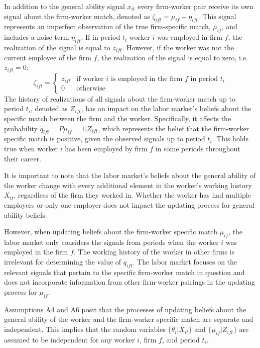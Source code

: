 \documentclass[12pt]{article}
\begin{document}
\begin{enumerate}[label={A}{\arabic*}.]
    In addition to the general ability signal $x_{it}$ every firm-worker pair receive its own signal about the firm-worker match, denoted as $\zeta_{ift} = \mu_{if} + \eta_{ift}$. This signal represents an imperfect observation of the true firm-specific match, $\mu_{if}$, and includes a noise term $\eta_{ift}$. If in period $t_i$ worker $i$ was employed in firm $f$, the realization of the signal is equal to $z_{ift}$. However, if the worker was not the current employee of the firm $f$, the realization of the signal is equal to zero, i.e. $z_{ift} = 0$:
    \begin{equation}
        \zeta_{ift} = 
        \begin{cases}
            z_{ift} & \text{if worker $i$ is employed in the firm $f$ in period $t_i$} \\
            0 & \text{otherwise}
        \end{cases}
    \end{equation}
    The history of realizations of all signals about the firm-worker match up to period $t_i$, denoted as $Z_{ift}$, has an impact on the labor market's beliefs about the specific match between the firm and the worker. Specifically, it affects the probability $q_{ift} = P{\mu_{if} = 1 | Z_{ift}}$, which represents the belief that the firm-worker specific match is positive, given the observed signals up to period $t_i$. This holds true when worker $i$ has been employed by firm $f$ in some periods throughout their career.
\end{enumerate}	 

It is important to note that the labor market's beliefs about the general ability of the worker change with every additional element in the worker's working history $X_{it}$, regardless of the firm they worked in. Whether the worker has had multiple employers or only one employer does not impact the updating process for general ability beliefs. 
   
However, when updating beliefs about the firm-worker specific match $\mu_{if}$, the labor market only considers the signals from periods when the worker $i$ was employed in the firm $f$. The working history of the worker in other firms is irrelevant for determining the value of $q_{ift}$. The labor market focuses on the relevant signals that pertain to the specific firm-worker match in question and does not incorporate information from other firm-worker pairings in the updating process for $\mu_{if}$.

Assumptions A4 and A6 posit that the processes of updating beliefs about the general ability of the worker and the firm-worker specific match are separate and independent. This implies that the random variables $\{\theta_i | X_{it}\}$ and $\{\mu_{if} | Z_{ift}\}$ are assumed to be independent for any worker $i$, firm $f$, and period $t_i$.
\end{document}
